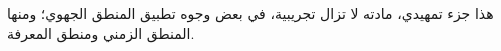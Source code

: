 \documentclass[../../include/open-logic-part]{subfiles}
\begin{document}

\begin{editorial}
هذا جزء تمهيدي، مادته لا تزال تجريبية، في بعض وجوه تطبيق المنطق الجهوي؛
ومنها المنطق الزمني ومنطق المعرفة.
\end{editorial}



\OLEndPartHook
\end{document}
